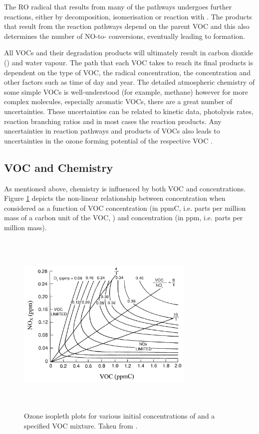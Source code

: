 The RO radical that results from many of the  pathways undergoes further reactions, either by decomposition, 
isomerisation or reaction with . The products that result from the reaction pathways depend on the parent VOC and this 
also determines the number of NO-to- conversions, eventually leading to  formation.

All VOCs and their degradation products will ultimately result in carbon dioxide () and water vapour. The path that 
each VOC takes to reach its final products is dependent on the type of VOC, the radical concentration, the  
concentration and other factors such as time of day and year. The detailed atmospheric chemistry of some simple VOCs is 
well-understood (for example, methane) however for more complex molecules, especially aromatic VOCs, there are a great number 
of uncertainties. These uncertainties can be related to kinetic data, photolysis rates, reaction branching ratios and in most 
cases the reaction products. Any uncertainties in reaction pathways and products of VOCs also leads to uncertainties in the 
ozone forming potential of the respective VOC \citep{Atkinson:2000}.

\subsection{\texorpdfstring{VOC and  Chemistry}{VOC and NOx Chemistry}} \label{s:VOC&NOx}
As mentioned above,  chemistry is influenced by both VOC and  concentrations. Figure \ref{f:O3_isopleth} 
depicts the non-linear relationship between  concentration when considered as a function of VOC concentration (in ppmC, 
i.e. parts per million mass of a carbon unit of the VOC, ) and  concentration (in ppm, i.e. parts per 
million mass). 
\begin{figure}[ht]
	\begin{center}
		\includegraphics[height=90mm, width=85mm]{../img/O3_isopleth_1.png}
		\caption{Ozone isopleth plots for various initial concentrations of  and a specified VOC mixture. Taken from \citep{Jenkin:2000}.}
		\label{f:O3_isopleth}
	\end{center}
\end{figure}

